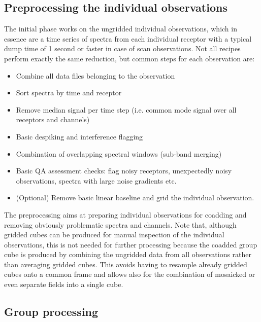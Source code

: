 \documentclass[final,authoryear,5p,times,twocolumn]{elsarticle}
\begin{document}
\subsection{Preprocessing the individual observations}

The initial phase works on the ungridded individual observations,
which in essence are a time series of spectra from each individual
receptor with a typical dump time of 1 second or faster in case of scan
observations.  Not all recipes perform exactly the same reduction, but
common steps for each observation are:
\begin{itemize}
\item Combine all data files belonging to the observation
\item Sort spectra by time and receptor
\item Remove median signal per time step (i.e. common mode signal over
all receptors and channels)
\item Basic despiking and interference flagging
\item Combination of overlapping spectral windows (sub-band merging)
\item Basic QA assessment checks: flag noisy receptors, unexpectedly noisy
observations, spectra with large noise gradients etc.
\item (Optional) Remove basic linear baseline and grid the individual
observation.
\end{itemize}

The preprocessing aims at preparing individual observations for
coadding and removing obviously problematic spectra and channels.
Note that, although gridded cubes can be produced for manual
inspection of the individual observations, this is not needed for
further processing because the coadded group cube is produced by
combining the ungridded data from all observations rather than
averaging gridded cubes.  This avoids having to resample already
gridded cubes onto a common frame and allows also for the combination
of mosaicked or even separate fields into a single cube.

\subsection{Group processing}
\end{document}
